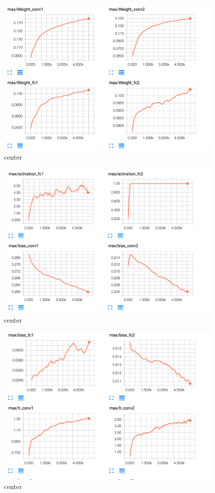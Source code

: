 \documentclass[12pt]{article}
\begin{document}
\begin{figure}[H]
  \caption{center}
  \centering
    \includegraphics[scale=0.3]{bmax1.png}
\end{figure}
\begin{figure}[H]
  \caption{center}
  \centering
    \includegraphics[scale=0.3]{bmax2.png}
\end{figure}

\begin{figure}[H]
  \caption{center}
  \centering
    \includegraphics[scale=0.3]{bmax3.png}
\end{figure}
\end{document}
